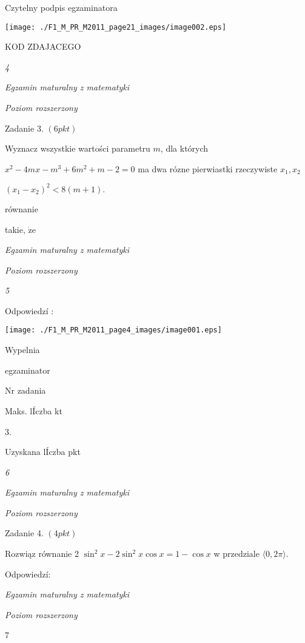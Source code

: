 \documentclass[a4paper,12pt]{article}
\begin{document}
Czytelny podpis egzaminatora
\begin{center}
\texttt{[image: ./F1\_M\_PR\_M2011\_page21\_images/image002.eps]}
\end{center}
KOD ZDAJACEGO





{\it 4}

{\it Egzamin maturalny z matematyki}

{\it Poziom rozszerzony}

Zadanie 3. $(6pkt)$

Wyznacz wszystkie wartości parametru $m$, dla których

$x^{2}-4mx-m^{3}+6m^{2}+m-2=0$ ma dwa rózne pierwiastki rzeczywiste $x_{1}, x_{2}$

$(x_{1}-x_{2})^{2}<8(m+1).$

równanie

takie, $\dot{\mathrm{z}}\mathrm{e}$





{\it Egzamin maturalny z matematyki}

{\it Poziom rozszerzony}

{\it 5}

Odpowiedzí :
\begin{center}
\texttt{[image: ./F1\_M\_PR\_M2011\_page4\_images/image001.eps]}
\end{center}
Wypelnia

egzaminator

Nr zadania

Maks. lÍczba kt

3.

Uzyskana lÍczba pkt





{\it 6}

{\it Egzamin maturalny z matematyki}

{\it Poziom rozszerzony}

Zadanie 4. $(4pkt)$

Rozwiąz równanie 2 $\sin^{2}x-2\sin^{2}x\cos x=1-\cos x$ w przedziale $\langle 0,2\pi\rangle.$

Odpowiedzí:





{\it Egzamin maturalny z matematyki}

{\it Poziom rozszerzony}

7
\end{document}
